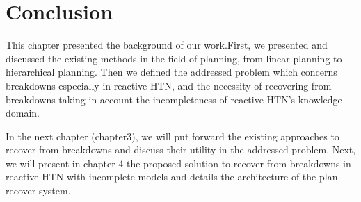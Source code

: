  \section{Conclusion}
This chapter presented the background of our work.First, we presented and discussed the existing methods in the field of planning, from linear planning to hierarchical planning. Then we defined  the addressed problem which concerns breakdowns especially in reactive HTN, and the necessity of recovering from breakdowns taking in account the incompleteness of reactive HTN's knowledge domain.

In the next chapter (chapter3), we will put forward the existing approaches to recover from breakdowns and discuss their utility in the addressed problem. Next, we will present in chapter 4 the proposed solution to recover from breakdowns in reactive HTN with incomplete models and details the architecture of the plan recover system. 
 